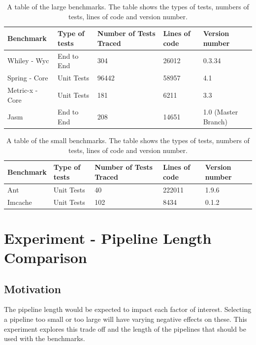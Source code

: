 \begin{table}[H]
\centering
\begin{tabular}{|l|l|l|l|l|}
\hline
{\bf Benchmark}    & {\bf Type of tests}   &  {\bf Number of Tests Traced} & {\bf Lines of code} & {\bf Version number}   \\ \hline
Whiley - Wyc      & End to End  &    304   &   26012       &       0.3.34   \\ \hline
Spring - Core   & Unit Tests  &  96442  &    58957      & 4.1 \\ \hline
Metric-x - Core &  Unit Tests  &  181 &    6211      & 3.3 \\ \hline
Jasm              &   End to End   &  208     &     14651     & 1.0 (Master Branch) \\ \hline

\end{tabular}
\caption{A table of the large benchmarks. The table shows the types of tests, numbers of tests, lines of code and version number.}
\label{large_test}
\end{table}

\begin{table}[H]
\centering
\begin{tabular}{|l|l|l|l|l|}
\hline
{\bf Benchmark} & {\bf Type of tests}   & {\bf Number of Tests Traced} & {\bf Lines of code} & {\bf Version number}  \\ \hline
Ant             &   Unit Tests    &     40     & 222011 & 1.9.6 \\ \hline
Imcache &       Unit Tests    &    102        & 8434  & 0.1.2 \\ \hline
\end{tabular}
\caption{A table of the small benchmarks. The table shows the types of tests, numbers of tests, lines of code and version number.}
\label{small_test}
\end{table}

\section{Experiment  - Pipeline Length Comparison }
\label{sec:pipelineEva}

\subsection{Motivation}
The pipeline length would be expected to impact each factor of interest. Selecting a pipeline too small or too large will have varying negative effects on these. This experiment explores this trade off and the length of the pipelines that should be used with the benchmarks.

